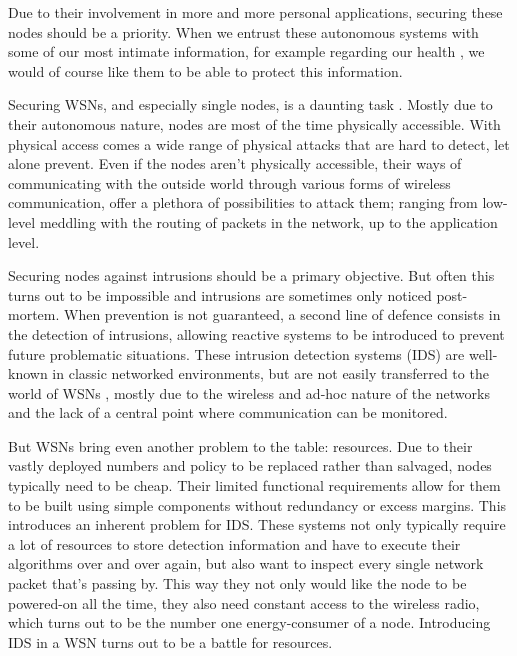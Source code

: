\documentclass[conference]{IEEEtran}
\begin{document}
Due to their involvement in more and more personal applications, securing these
nodes should be a priority. When we entrust these autonomous systems with some
of our most intimate information, for example regarding our health
\cite{stankovic2005wireless}, we would of course like them to be able to
protect this information.

Securing WSNs, and especially single nodes, is a daunting task
\cite{perrig2004security}. Mostly due to their autonomous nature, nodes are
most of the time physically accessible. With physical access comes a wide range
of physical attacks \cite{becher2006tampering} that are hard to detect, let
alone prevent. Even if the nodes aren't physically accessible, their ways of
communicating with the outside world through various forms of wireless
communication, offer a plethora of possibilities \cite{padmavathi2009survey} to
attack them; ranging from low-level meddling with the routing of packets in the
network, up to the application level.

Securing nodes against intrusions should be a primary objective. But often this
turns out to be impossible and intrusions are sometimes only noticed
post-mortem. When prevention is not guaranteed, a second line of defence
consists in the detection of intrusions, allowing reactive systems to be
introduced to prevent future problematic situations. These intrusion detection
systems (IDS) are well-known in classic networked environments, but are not
easily transferred to the world of WSNs \cite{zhang2000intrusion}
\cite{djenouri2005survey}, mostly due to the wireless and ad-hoc nature of the
networks and the lack of a central point where communication can be monitored.

But WSNs bring even another problem to the table: resources. Due to their
vastly deployed numbers and policy to be replaced rather than salvaged, nodes
typically need to be cheap. Their limited functional requirements allow for
them to be built using simple components without redundancy or excess margins.
This introduces an inherent problem for IDS. These systems not only typically
require a lot of resources to store detection information and have to execute
their algorithms over and over again, but also want to inspect every single
network packet that's passing by. This way they not only would like the node to
be powered-on all the time, they also need constant access to the wireless
radio, which turns out to be the number one energy-consumer of a node.
Introducing IDS in a WSN turns out to be a battle for resources.
\end{document}
